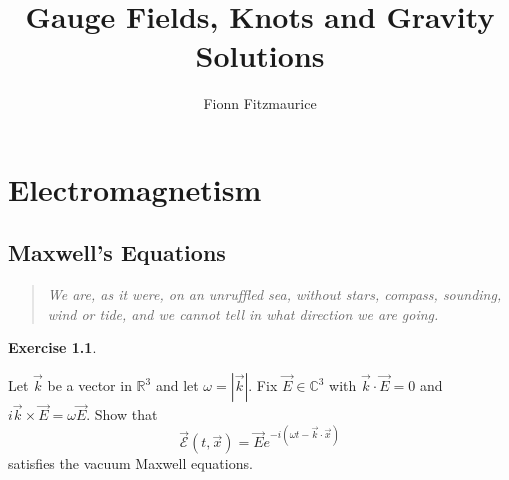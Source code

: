 \documentclass[11pt, a4paper]{report}
\title{Gauge Fields, Knots and Gravity Solutions}
\author{Fionn Fitzmaurice \hspace{2em} \https{fionn.github.io/gfkg}}
\date{}
\theoremstyle{definition}
\newtheorem{ex}{Exercise}[part]
\newenvironment{epigraph}
    {\begin{quote}\small\itshape} %
    {\end{quote}\ignorespacesafterend\vspace{\parskip}}
\begin{document}
\thispagestyle{empty}

\maketitle

\vspace{-20ex}

\tableofcontents

\thispagestyle{empty}

\clearpage


\part{Electromagnetism}

\chapter{Maxwell's Equations}

\begin{epigraph}
    We are, as it were, on an unruffled sea, without stars, compass, sounding, wind or tide,
    and we cannot tell in what direction we are going.
\end{epigraph}

\begin{ex}\label{ex:i1}

Let $\vec{k}$ be a vector in $\mathbb{R}^3$ and let $\omega = |\vec{k}|$. Fix $\vec{E} \in \mathbb{C}^3$ with $\vec{k} \cdot \vec{E} = 0$ and $i \vec{k} \times \vec{E} = \omega \vec{E}$. Show that
\[
    \vec{\mathcal{E}}(t, \vec{x}) = \vec{E} e^{-i(\omega t - \vec{k} \cdot \vec{x})}
\]
satisfies the vacuum Maxwell equations.

\end{ex}
\end{document}
